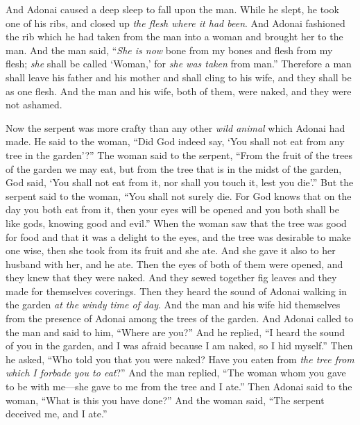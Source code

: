\begin{biblechapter}
\verse And Adonai caused a deep sleep to fall upon the man. While he slept, he took one of his ribs, and closed up \textit{the flesh where it had been}.
\verse And Adonai fashioned the rib which he had taken from the man into a woman and brought her to the man.
\verse And the man said, “\textit{She is now} bone from my bones 
and flesh from my flesh; 
\textit{she} shall be called ‘Woman,’ 
for \textit{she was taken} from man.”
\verse Therefore a man shall leave his father and his mother and shall cling to his wife, and they shall be as one flesh.
\verse And the man and his wife, both of them, were naked, and they were not ashamed.
\end{biblechapter}

\begin{biblechapter} %
 Now the serpent was more crafty than any other \textit{wild animal} which Adonai had made. He said to the woman, “Did God indeed say, ‘You shall not eat from any tree in the garden’?”
\verse The woman said to the serpent, “From the fruit of the trees of the garden we may eat,
\verse but from the tree that is in the midst of the garden, God said, ‘You shall not eat from it, nor shall you touch it, lest you die’.”
\verse But the serpent said to the woman, “You shall not surely die.
\verse For God knows that on the day you both eat from it, then your eyes will be opened and you both shall be like gods, knowing good and evil.”
\verse When the woman saw that the tree was good for food and that it was a delight to the eyes, and the tree was desirable to make one wise, then she took from its fruit and she ate. And she gave it also to her husband with her, and he ate.
\verse Then the eyes of both of them were opened, and they knew that they were naked. And they sewed together fig leaves and they made for themselves coverings.
\verse Then they heard the sound of Adonai walking in the garden \textit{at the windy time of day}. And the man and his wife hid themselves from the presence of Adonai among the trees of the garden.
\verse And Adonai called to the man and said to him, “Where are you?”
\verse And he replied, “I heard the sound of you in the garden, and I was afraid because I am naked, so I hid myself.”
\verse Then he asked, “Who told you that you were naked? Have you eaten from \textit{the tree from which I forbade you to eat}?”
\verse And the man replied, “The woman whom you gave to be with me—she gave to me from the tree and I ate.”
\verse Then Adonai said to the woman, “What is this you have done?” And the woman said, “The serpent deceived me, and I ate.”

\end{biblechapter}
